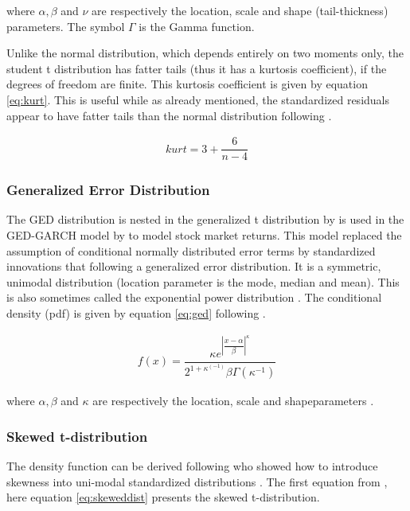 \documentclass[a4paper, twoside]{templates/ociamthesis}
\begin{document}
where \(\alpha, \beta\) and \(\nu\) are respectively the location, scale and shape (tail-thickness) parameters. The symbol \(\Gamma\) is the Gamma function.

Unlike the normal distribution, which depends entirely on two moments only, the student t distribution has fatter tails (thus it has a kurtosis coefficient), if the degrees of freedom are finite. This kurtosis coefficient is given by equation \eqref{eq:kurt}. This is useful while as already mentioned, the standardized residuals appear to have fatter tails than the normal distribution following \textcite{bollerslev2008}.

\begin{align}
kurt = 3 + \dfrac{6}{n-4}
 \label{eq:kurt}
\end{align}

\hypertarget{generalized-error-distribution}{%
\subsubsection{Generalized Error Distribution}\label{generalized-error-distribution}}

The GED distribution is nested in the generalized t distribution by \textcite{mcdonald1988} is used in the GED-GARCH model by \textcite{nelson1991} to model stock market returns. This model replaced the assumption of conditional normally distributed error terms by standardized innovations that following a generalized error distribution. It is a symmetric, unimodal distribution (location parameter is the mode, median and mean). This is also sometimes called the exponential power distribution \autocite{bollerslev2008}. The conditional density (pdf) is given by equation \eqref{eq:ged} following \textcite{ghalanos2020}.

\begin{align}
f(x) = \dfrac{\kappa e^{\left|\dfrac{x-\alpha}{\beta}\right|^\kappa}}{2^{1+\kappa^(-1)}\beta\Gamma(\kappa^{-1})}
 \label{eq:ged}
\end{align}

where \(\alpha, \beta\) and \(\kappa\) are respectively the location, scale and shapeparameters .

\hypertarget{skewed-t-distribution}{%
\subsubsection{Skewed t-distribution}\label{skewed-t-distribution}}

The density function can be derived following \textcite{fernández1998} who showed how to introduce skewness into uni-modal standardized distributions \autocite{trottier2015}. The first equation from \textcite{trottier2015}, here equation \eqref{eq:skeweddist} presents the skewed t-distribution.
\end{document}
